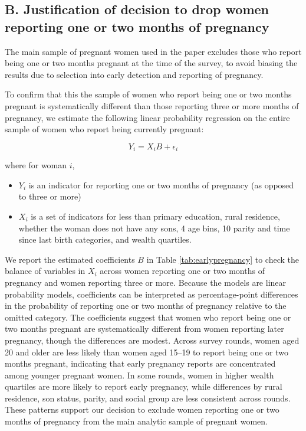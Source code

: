 \documentclass[10pt,twoside,reqno]{article}
\begin{document}
\clearpage
\renewcommand{\thesection}{B-\arabic{section}}
\setcounter{equation}{0}
\renewcommand{\theequation}{B-\arabic{equation}}
\setcounter{figure}{0}
\renewcommand{\thefigure}{B-\arabic{figure}}
\setcounter{table}{0}
\renewcommand{\thetable}{B-\arabic{table}}

\subsection*{B. Justification of decision to drop women reporting one or two months of pregnancy} \label{sec:dropearlypregnancy}

The main sample of pregnant women used in the paper excludes those who report being one or two months pregnant at the time of the survey, 
to avoid biasing the results due to selection into early detection and reporting of pregnancy.

To confirm that this the sample of women who report being one or two months pregnant is systematically different than those reporting three or more months of 
pregnancy, we estimate the following linear probability regression on the entire sample of women who report being currently pregnant:

\begin{equation}
Y_i=X_i B+\epsilon_i
\end{equation}

where for woman $i$, 
\begin{itemize}
    \item $Y_i$ is an indicator for reporting one or two months of pregnancy (as opposed to three or more)
    \item $X_i$ is a set of indicators for less than primary education, rural residence, whether the woman does not have any sons, 4 age bins, 10 parity and time since last birth categories, and wealth quartiles. 
\end{itemize}

We report the estimated coefficients $B$ in Table \ref{tab:earlypregnancy} to check the balance of variables in $X_i$ across women reporting one or two months of pregnancy and women reporting three or more. Because the models are linear probability models, coefficients can be interpreted as percentage-point differences in the probability of reporting one or two months of pregnancy relative to the omitted category. The coefficients suggest that women who report being one or two months pregnant are systematically different from women reporting later pregnancy, though the differences are modest. Across survey rounds, women aged 20 and older are less likely than women aged 15--19 to report being one or two months pregnant, indicating that early pregnancy reports are concentrated among younger pregnant women. In some rounds, women in higher wealth quartiles are more likely to report early pregnancy, while differences by rural residence, son status, parity, and social group are less consistent across rounds. These patterns support our decision to exclude women reporting one or two months of pregnancy from the main analytic sample of pregnant women.
\end{document}
